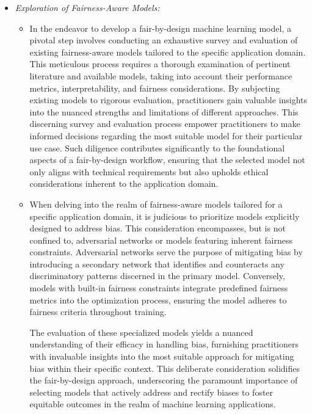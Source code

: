 \begin{itemize}

    \item \emph{Exploration of Fairness-Aware Models:}
     
    \begin{itemize}
    
        \item In the endeavor to develop a fair-by-design machine learning model, a pivotal step involves conducting an exhaustive survey and evaluation of existing fairness-aware models tailored to the specific application domain. This meticulous process requires a thorough examination of pertinent literature and available models, taking into account their performance metrics, interpretability, and fairness considerations. By subjecting existing models to rigorous evaluation, practitioners gain valuable insights into the nuanced strengths and limitations of different approaches. This discerning survey and evaluation process empower practitioners to make informed decisions regarding the most suitable model for their particular use case. Such diligence contributes significantly to the foundational aspects of a fair-by-design workflow, ensuring that the selected model not only aligns with technical requirements but also upholds ethical considerations inherent to the application domain.
    
        \item When delving into the realm of fairness-aware models tailored for a specific application domain, it is judicious to prioritize models explicitly designed to address bias. This consideration encompasses, but is not confined to, adversarial networks or models featuring inherent fairness constraints. Adversarial networks serve the purpose of mitigating bias by introducing a secondary network that identifies and counteracts any discriminatory patterns discerned in the primary model. Conversely, models with built-in fairness constraints integrate predefined fairness metrics into the optimization process, ensuring the model adheres to fairness criteria throughout training.

        The evaluation of these specialized models yields a nuanced understanding of their efficacy in handling bias, furnishing practitioners with invaluable insights into the most suitable approach for mitigating bias within their specific context. This deliberate consideration solidifies the fair-by-design approach, underscoring the paramount importance of selecting models that actively address and rectify biases to foster equitable outcomes in the realm of machine learning applications.    
    

\end{itemize}
\end{itemize}
